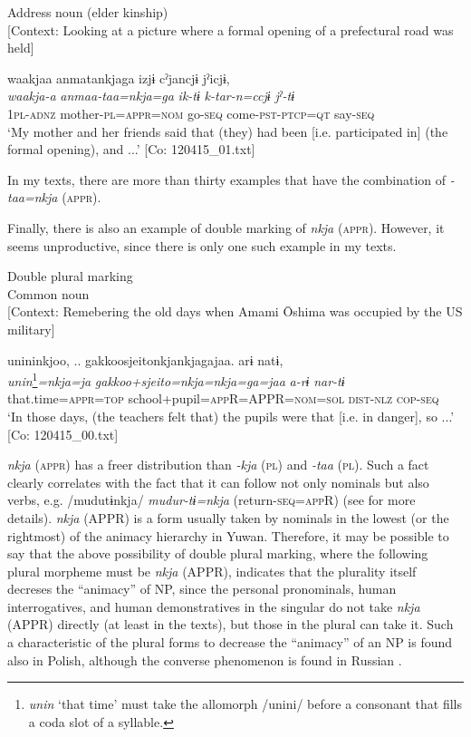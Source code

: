 \ex Address noun (elder kinship)\\{}
[Context: Looking at a picture where a formal opening of a prefectural road was held]

{\TM}
\glll waakjaa  anmatankjaga  izjɨ  cˀjancjɨ   jˀicjɨ,\\
      \textit{waakja-a}  \textit{anmaa-taa=nkja=ga}  \textit{ik-tɨ}  \textit{k-tar-n=ccjɨ}  \textit{jˀ-tɨ}\\
      1\textsc{pl}-\textsc{adnz}  mother-\textsc{pl}=\textsc{appr}=\textsc{nom}  go-\textsc{seq}  come-\textsc{pst}-\textsc{ptcp}=\textsc{qt}  say-\textsc{seq}\\
\glt ‘My mother and her friends said that (they) had been [i.e. participated in] (the formal opening), and ...’ [Co: 120415\_01.txt]
\z

In my texts, there are more than thirty examples that have the combination of \textit{-taa=nkja} (\textsc{appr}).

Finally, there is also an example of double marking of \textit{nkja} (\textsc{appr}). However, it seems unproductive, since there is only one such example in my texts.

\ea\label{ex:6-104}
  Double plural marking\\{}
  Common noun\\{}
  [Context: Remebering the old days when Amami Ōshima was occupied by the US military]

{\TM}
\glll unininkjoo, ..\textsubscript{} {\textbar}gakkoosjeito{\textbar}nkjankjagajaa.    arɨ  natɨ,\\
\textit{unin}\footnote{\textit{unin} ‘that time’ must take the allomorph /unini/ before a consonant that fills a coda slot of a syllable.}\textit{=nkja=ja}  \textit{gakkoo+sjeito=nkja=nkja=ga=jaa}    \textit{a-rɨ}  \textit{nar-tɨ}\\
    that.time=\textsc{appr}=\textsc{top}  school+pupil=\textsc{app}R=APPR=\textsc{nom}=\textsc{sol}    \textsc{dist}-\textsc{nlz}  \textsc{cop}-\textsc{seq}\\
\glt    ‘In those days, (the teachers felt that) the pupils were that [i.e. in danger], so ...’ [Co: 120415\_00.txt]
\z

\textit{nkja} (\textsc{appr}) has a freer distribution than \textit{-kja} (\textsc{pl}) and \textit{-taa} (\textsc{pl}). Such a fact clearly correlates with the fact that it can follow not only nominals but also verbs, e.g. /mudutɨnkja/ \textit{mudur-tɨ=nkja} (return-\textsc{seq}=\textsc{app}R) (see for more details). \textit{nkja} (APPR) is a form usually taken by nominals in the lowest (or the rightmost) of the animacy hierarchy in Yuwan. Therefore, it may be possible to say that the above possibility of double plural marking, where the following plural morpheme must be \textit{nkja} (APPR), indicates that the plurality itself decreses the “animacy” of NP, since the personal pronominals, human interrogatives, and human demonstratives in the singular do not take \textit{nkja} (APPR) directly (at least in the texts), but those in the plural can take it. Such a characteristic of the plural forms to decrease the “animacy” of an NP is found also in Polish, although the converse phenomenon is found in Russian \citep[188]{Comrie1989}.

